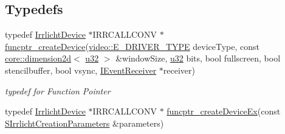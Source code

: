 \subsection*{Typedefs}
\begin{DoxyCompactItemize}
\item 
typedef \hyperlink{classirr_1_1IrrlichtDevice}{Irrlicht\+Device} $\ast$I\+R\+R\+C\+A\+L\+L\+C\+O\+NV $\ast$ \hyperlink{namespaceirr_a0ab845f2df3820e04106b7625e9919cd}{funcptr\+\_\+create\+Device}(\hyperlink{namespaceirr_1_1video_ae35a6de6d436c76107ad157fe42356d0}{video\+::\+E\+\_\+\+D\+R\+I\+V\+E\+R\+\_\+\+T\+Y\+PE} device\+Type, const \hyperlink{classirr_1_1core_1_1dimension2d}{core\+::dimension2d}$<$ \hyperlink{namespaceirr_a0416a53257075833e7002efd0a18e804}{u32} $>$ \&window\+Size, \hyperlink{namespaceirr_a0416a53257075833e7002efd0a18e804}{u32} bits, bool fullscreen, bool stencilbuffer, bool vsync, \hyperlink{classirr_1_1IEventReceiver}{I\+Event\+Receiver} $\ast$receiver)\hypertarget{namespaceirr_a0ab845f2df3820e04106b7625e9919cd}{}\label{namespaceirr_a0ab845f2df3820e04106b7625e9919cd}

\begin{DoxyCompactList}\small\item\em typedef for Function Pointer \end{DoxyCompactList}\item 
typedef \hyperlink{classirr_1_1IrrlichtDevice}{Irrlicht\+Device} $\ast$I\+R\+R\+C\+A\+L\+L\+C\+O\+NV $\ast$ \hyperlink{namespaceirr_a5137701377b2241305607fc37a27e9f8}{funcptr\+\_\+create\+Device\+Ex}(const \hyperlink{structirr_1_1SIrrlichtCreationParameters}{S\+Irrlicht\+Creation\+Parameters} \&parameters)\hypertarget{namespaceirr_a5137701377b2241305607fc37a27e9f8}{}\label{namespaceirr_a5137701377b2241305607fc37a27e9f8}


\end{DoxyCompactItemize}
